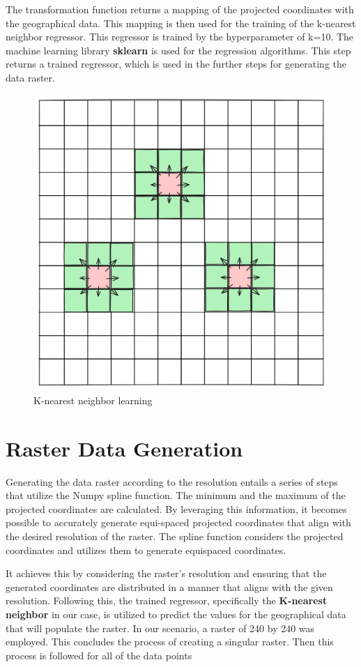 The transformation function returns a mapping of the projected coordinates with the geographical data.
This mapping is then used for the training of the k-nearest neighbor regressor. This regressor is trained by the hyperparameter of k=10. The machine learning library \textbf{sklearn} is used for the regression algorithms.
This step returns a trained regressor, which is used in the further steps for generating the data raster.
\begin{figure}[h]
    \centering
    \includegraphics[width=0.5\linewidth]{figures/chapter-7/raster_interpolation.png}
    \caption{K-nearest neighbor learning}
    \label{fig:knn-learning}
\end{figure}

\section{Raster Data Generation}

Generating the data raster according to the resolution entails a series of steps that utilize the Numpy spline function. The minimum and the maximum of the projected coordinates are calculated. By leveraging this information, it becomes possible to accurately generate equi-spaced projected coordinates that align with the desired resolution of the raster.
The spline function considers the projected coordinates and utilizes them to generate equispaced coordinates.

It achieves this by considering the raster's resolution and ensuring that the generated coordinates are distributed in a manner that aligns with the given resolution.
Following this, the trained regressor, specifically the \textbf{K-nearest neighbor} in our case, is utilized to predict the values for the geographical data that will populate the raster.
In our scenario, a raster of 240 by 240 was employed. This concludes the process of creating a singular raster. Then this process is followed for all of the data points

